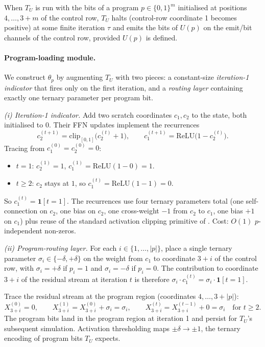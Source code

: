 \documentclass{article}
\theoremstyle{definition}
\newcommand{\B}{\{0,1\}}
\begin{document}
When $T_U$ is run with the bits of a program $p \in \B^m$ initialised at
positions $4, \ldots, 3 + m$ of the control row, $T_U$ halts (control-row
coordinate 1 becomes positive) at some finite iteration $\tau$ and emits the
bits of $U(p)$ on the emit/bit channels of the control row, provided $U(p)$ is
defined.

\paragraph{Program-loading module.} We construct $\theta_p$ by augmenting $T_U$ with two pieces: a constant-size
\emph{iteration-1 indicator} that fires only on the first iteration, and a
\emph{routing layer} containing exactly one ternary parameter per program bit.

\emph{(i) Iteration-1 indicator.} Add two scratch coordinates $c_1, c_2$ to the state, both
initialised to $0$. Their FFN updates implement the recurrences
\[
  c_2^{(t+1)} = \mathrm{clip}_{[0,1]}\!\bigl(c_2^{(t)} + 1\bigr), \qquad
  c_1^{(t+1)} = \mathrm{ReLU}\!\bigl(1 - c_2^{(t)}\bigr).
\]
Tracing from $c_1^{(0)} = c_2^{(0)} = 0$:
\begin{itemize}
  \item $t = 1$: $c_2^{(1)} = 1$, $c_1^{(1)} = \mathrm{ReLU}(1 - 0) = 1$.
  \item $t \ge 2$: $c_2$ stays at $1$, so $c_1^{(t)} = \mathrm{ReLU}(1 - 1) = 0$.
\end{itemize}
So $c_1^{(t)} = \mathbf{1}[t = 1]$. The recurrences use four ternary parameters total
(one self-connection on $c_2$, one bias on $c_2$, one cross-weight $-1$ from
$c_2$ to $c_1$, one bias $+1$ on $c_1$) plus reuse of the standard
activation clipping primitive of \citet{li2025constant}. Cost: $O(1)$
$p$-independent non-zeros.

\emph{(ii) Program-routing layer.} For each $i \in \{1, \ldots, |p|\}$, place a single ternary parameter $\sigma_i \in
  \{-\delta, +\delta\}$ on the weight from $c_1$ to coordinate $3 + i$ of the
control row, with $\sigma_i = +\delta$ if $p_i = 1$ and $\sigma_i = -\delta$ if
$p_i = 0$. The contribution to coordinate $3 + i$ of the residual stream at
iteration $t$ is therefore $\sigma_i \cdot c_1^{(t)} = \sigma_i \cdot \mathbf{1}[t=1]$.

Trace the residual stream at the program region (coordinates $4, \ldots, 3 +
  |p|$):
\[
  X^{(0)}_{3+i} = 0, \qquad X^{(1)}_{3+i} = X^{(0)}_{3+i} + \sigma_i = \sigma_i, \qquad X^{(t)}_{3+i} = X^{(t-1)}_{3+i} + 0 = \sigma_i \quad \text{for } t \ge 2.
\]
The program bits land in the program region at iteration 1 and persist for
$T_U$'s subsequent simulation. Activation thresholding maps $\pm \delta \to \pm
  1$, the ternary encoding of program bits $T_U$ expects.
\end{document}
